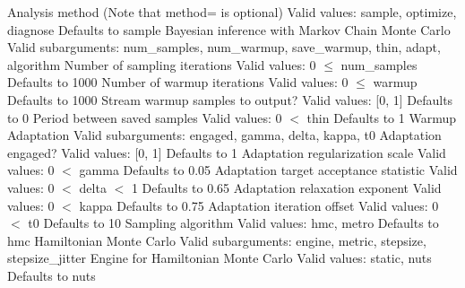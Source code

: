 \begin{description}
  {Analysis method (Note that method= is optional)}
  {Valid values: sample, optimize, diagnose}
  {Defaults to sample}
%
    {Bayesian inference with Markov Chain Monte Carlo}
    {Valid subarguments: num\_samples, num\_warmup, save\_warmup, thin, adapt, algorithm}
%
      {Number of sampling iterations}
      {Valid values: 0 $\le$ num\_samples}
      {Defaults to 1000}
%
      {Number of warmup iterations}
      {Valid values: 0 $\le$ warmup}
      {Defaults to 1000}
%
      {Stream warmup samples to output?}
      {Valid values: [0, 1]}
      {Defaults to 0}
%
      {Period between saved samples}
      {Valid values: 0 $<$ thin}
      {Defaults to 1}
%
      {Warmup Adaptation}
      {Valid subarguments: engaged, gamma, delta, kappa, t0}
%
        {Adaptation engaged?}
        {Valid values: [0, 1]}
        {Defaults to 1}
%
        {Adaptation regularization scale}
        {Valid values: 0 $<$ gamma}
        {Defaults to 0.05}
%
        {Adaptation target acceptance statistic}
        {Valid values: 0 $<$ delta $<$ 1}
        {Defaults to 0.65}
%
        {Adaptation relaxation exponent}
        {Valid values: 0 $<$ kappa}
        {Defaults to 0.75}
%
        {Adaptation iteration offset}
        {Valid values: 0 $<$ t0}
        {Defaults to 10}
%
      {Sampling algorithm}
      {Valid values: hmc, metro}
      {Defaults to hmc}
%
        {Hamiltonian Monte Carlo}
        {Valid subarguments: engine, metric, stepsize, stepsize\_jitter}
%
          {Engine for Hamiltonian Monte Carlo}
          {Valid values: static, nuts}
          {Defaults to nuts}

\end{description}
